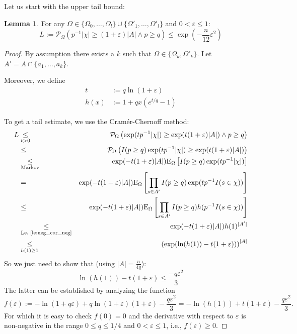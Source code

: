 \documentclass{article}
\newcommand{\prob}{\mathcal P}
\newcommand{\expectation}{\mathrm{E}}
\newcommand{\eps}{\varepsilon}
\theoremstyle{definition}
\newtheorem{lemma}{Lemma}
\begin{document}
Let us start with the upper tail bound:
\begin{lemma}
\label{le:upper_tail}
For any $\Omega \in \{\Omega_0,\ldots,\Omega_l\} \cup \{\Omega'_1,\ldots,\Omega'_l\}$ and $0 < \eps \leq 1$:
\[
L := \prob_{\Omega} \left( p^{-1} |\chi| \geq (1+\eps) |A| \wedge p \geq q\right) \leq \exp\left(-\frac{n}{12} \eps^2\right)
\]
\end{lemma}
\begin{proof}
By assumption there exists a $k$ such that $\Omega \in \{\Omega_k, \Omega'_k\}$. Let $A' = A \cap \{a_1,\ldots,a_k\}$.

Moreover, we define
\begin{align*}
  t & := q \ln( 1 + \eps) \\
  h(x) & := 1+qx(e^{t/q}-1)  
\end{align*}

To get a tail estimate, we use the Cram\'{e}r-Chernoff method:
{\allowdisplaybreaks
\begin{eqnarray*}
  L & \underset{t > 0}{\leq} & \prob_{\Omega} \left( \exp(t p^{-1} |\chi|) \geq \exp(t (1+\eps) |A|) \wedge p \geq q \right) \\
  & \leq & \prob_{\Omega} \left( I(p \geq q) \exp(t p^{-1} |\chi|) \geq \exp(t (1+\eps) |A|) \right) \\
  & \underset{\textrm{Markov}}{\leq} & \exp( -t (1+\eps) |A| ) \expectation_\Omega \left[ I(p \geq q) \exp ( t p^{-1} |\chi| ) \right] \\
 & = & \exp( -t (1+\eps) |A| ) \expectation_\Omega \left[ \prod_{s \in A'} I(p \geq q) \exp ( t p^{-1} I(s \in \chi) ) \right] \\
 & \leq & \exp( -t (1+\eps) |A| ) \expectation_\Omega \left[ \prod_{s \in A'} I(p \geq q) h( p^{-1} I(s \in \chi) ) \right] \\
 & \underset{\textrm{Le.~\ref{le:neg_cor_neg}}}{\leq} & \exp( -t (1+\eps) |A| ) h(1)^{|A'|} \\
 & \underset{h(1)\geq 1}{\leq} & \left(\exp( \ln(h(1)) -t (1+\eps))\right) ^ {|A|} 
\end{eqnarray*}}
So we just need to show that (using $|A|=\frac{n}{4q}$):
\[
  \ln(h(1))-t (1+\eps) \leq \frac{-q \eps^2}{3}
\]
The latter can be established by analyzing the function
\[
  f(\eps) := -\ln(1+q \eps) + q \ln(1+\eps) (1+\eps) - \frac{q \eps^2}{3} = -\ln (h(1)) +t (1+\eps) - \frac{q\eps^2}{3} \textrm{.}
\]
For which it is easy to check $f(0) = 0$ and the derivative with respect to $\eps$ is non-negative in the range $0 \leq q \leq 1/4$ and $0 < \eps \leq 1$, i.e.,
$f(\eps) \geq 0$.
\end{proof}
\end{document}
